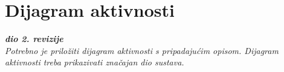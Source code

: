 		\section{Dijagram aktivnosti}
			
			\textbf{\textit{dio 2. revizije}}\\
			
			 \textit{Potrebno je priložiti dijagram aktivnosti s pripadajućim opisom. Dijagram aktivnosti treba prikazivati značajan dio sustava.}
			
			\eject
		\fi
		


